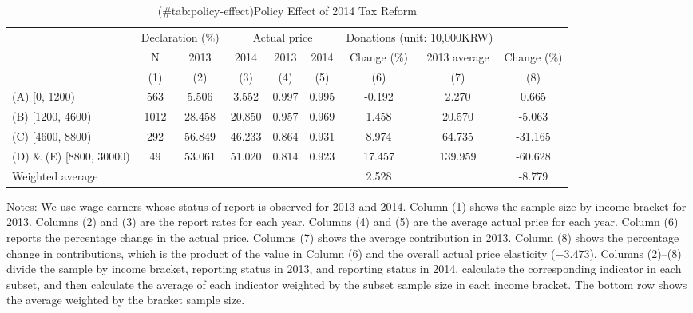 \begin{table}

\caption{(\#tab:policy-effect)Policy Effect of 2014 Tax Reform}
\centering
\fontsize{8}{10}\selectfont
\begin{threeparttable}
\begin{tabular}[t]{>{\raggedright\arraybackslash}p{10em}cccccccc}
\toprule
\multicolumn{2}{c}{ } & \multicolumn{2}{c}{Declaration (\%)} & \multicolumn{3}{c}{Actual price} & \multicolumn{2}{c}{Donations (unit: 10,000KRW)} \\
\cmidrule(l{3pt}r{3pt}){3-4} \cmidrule(l{3pt}r{3pt}){5-7} \cmidrule(l{3pt}r{3pt}){8-9}
\multicolumn{1}{c}{2013 Income bracket} & \multicolumn{1}{c}{N} & \multicolumn{1}{c}{2013} & \multicolumn{1}{c}{2014} & \multicolumn{1}{c}{2013} & \multicolumn{1}{c}{2014} & \multicolumn{1}{c}{Change (\%)} & \multicolumn{1}{c}{2013 average} & \multicolumn{1}{c}{Change (\%)} \\
\cmidrule(l{3pt}r{3pt}){1-1} \cmidrule(l{3pt}r{3pt}){2-2} \cmidrule(l{3pt}r{3pt}){3-3} \cmidrule(l{3pt}r{3pt}){4-4} \cmidrule(l{3pt}r{3pt}){5-5} \cmidrule(l{3pt}r{3pt}){6-6} \cmidrule(l{3pt}r{3pt}){7-7} \cmidrule(l{3pt}r{3pt}){8-8} \cmidrule(l{3pt}r{3pt}){9-9}
 & (1) & (2) & (3) & (4) & (5) & (6) & (7) & (8)\\
\midrule
(A) [0, 1200) & 563 & 5.506 & 3.552 & 0.997 & 0.995 & -0.192 & 2.270 & 0.665\\
(B) [1200, 4600) & 1012 & 28.458 & 20.850 & 0.957 & 0.969 & 1.458 & 20.570 & -5.063\\
(C) [4600, 8800) & 292 & 56.849 & 46.233 & 0.864 & 0.931 & 8.974 & 64.735 & -31.165\\
(D) \& (E) [8800, 30000) & 49 & 53.061 & 51.020 & 0.814 & 0.923 & 17.457 & 139.959 & -60.628\\
Weighted average &  &  &  &  &  & 2.528 &  & -8.779\\
\bottomrule
\end{tabular}
\begin{tablenotes}
\item Notes: We use wage earners whose status of report is observed for 2013 and 2014. Column (1) shows the sample size by income bracket for 2013. Columns (2) and (3) are the report rates for each year. Columns (4) and (5) are the average actual price for each year. Column (6) reports the percentage change in the actual price. Columns (7) shows the average contribution in 2013. Column (8) shows the percentage change in contributions, which is the product of the value in Column (6) and the overall actual price elasticity ($-3.473$). Columns (2)--(8) divide the sample by income bracket, reporting status in 2013, and reporting status in 2014, calculate the corresponding indicator in each subset, and then calculate the average of each indicator weighted by the subset sample size in each income bracket. The bottom row shows the average weighted by the bracket sample size.
\end{tablenotes}
\end{threeparttable}
\end{table}

